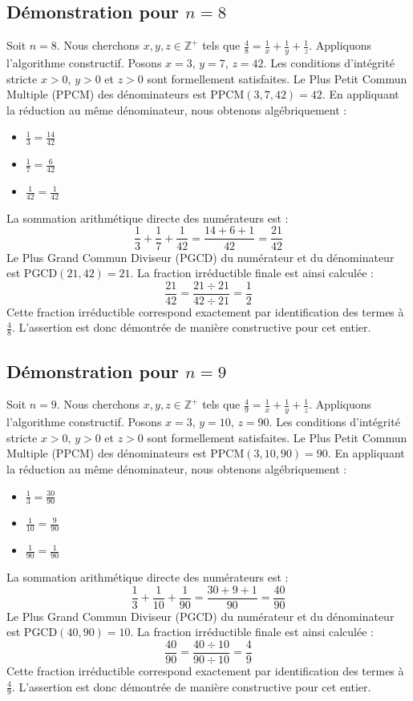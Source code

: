 \documentclass[11pt,a4paper]{article}
\begin{document}
\subsection{Démonstration pour $n = 8$}
Soit $n = 8$. Nous cherchons $x, y, z \in \mathbb{Z}^{+}$ tels que $\frac{4}{8} = \frac{1}{x} + \frac{1}{y} + \frac{1}{z}$.
Appliquons l'algorithme constructif. Posons $x = 3$, $y = 7$, $z = 42$.
Les conditions d'intégrité stricte $x > 0$, $y > 0$ et $z > 0$ sont formellement satisfaites.
Le Plus Petit Commun Multiple (PPCM) des dénominateurs est $\text{PPCM}(3, 7, 42) = 42$.
En appliquant la réduction au même dénominateur, nous obtenons algébriquement :
\begin{itemize}
    \item $\frac{1}{3} = \frac{14}{42}$
    \item $\frac{1}{7} = \frac{6}{42}$
    \item $\frac{1}{42} = \frac{1}{42}$
\end{itemize}
La sommation arithmétique directe des numérateurs est :
$$ \frac{1}{3} + \frac{1}{7} + \frac{1}{42} = \frac{14 + 6 + 1}{42} = \frac{21}{42} $$
Le Plus Grand Commun Diviseur (PGCD) du numérateur et du dénominateur est $\text{PGCD}(21, 42) = 21$.
La fraction irréductible finale est ainsi calculée :
$$ \frac{21}{42} = \frac{21 \div 21}{42 \div 21} = \frac{1}{2} $$
Cette fraction irréductible correspond exactement par identification des termes à $\frac{4}{8}$. L'assertion est donc démontrée de manière constructive pour cet entier.

\subsection{Démonstration pour $n = 9$}
Soit $n = 9$. Nous cherchons $x, y, z \in \mathbb{Z}^{+}$ tels que $\frac{4}{9} = \frac{1}{x} + \frac{1}{y} + \frac{1}{z}$.
Appliquons l'algorithme constructif. Posons $x = 3$, $y = 10$, $z = 90$.
Les conditions d'intégrité stricte $x > 0$, $y > 0$ et $z > 0$ sont formellement satisfaites.
Le Plus Petit Commun Multiple (PPCM) des dénominateurs est $\text{PPCM}(3, 10, 90) = 90$.
En appliquant la réduction au même dénominateur, nous obtenons algébriquement :
\begin{itemize}
    \item $\frac{1}{3} = \frac{30}{90}$
    \item $\frac{1}{10} = \frac{9}{90}$
    \item $\frac{1}{90} = \frac{1}{90}$
\end{itemize}
La sommation arithmétique directe des numérateurs est :
$$ \frac{1}{3} + \frac{1}{10} + \frac{1}{90} = \frac{30 + 9 + 1}{90} = \frac{40}{90} $$
Le Plus Grand Commun Diviseur (PGCD) du numérateur et du dénominateur est $\text{PGCD}(40, 90) = 10$.
La fraction irréductible finale est ainsi calculée :
$$ \frac{40}{90} = \frac{40 \div 10}{90 \div 10} = \frac{4}{9} $$
Cette fraction irréductible correspond exactement par identification des termes à $\frac{4}{9}$. L'assertion est donc démontrée de manière constructive pour cet entier.
\end{document}

